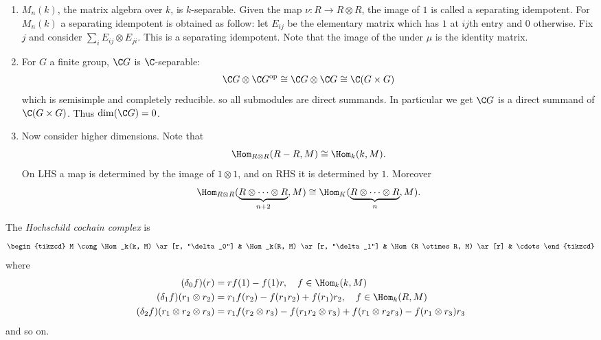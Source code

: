 \documentclass[a4paper]{article}
\begin{document}
\begin{eg}\leavevmode
  \begin{enumerate}
  \item \(M_n(k)\), the matrix algebra over \(k\), is \(k\)-separable. Given the map \(\nu: R \to R \otimes R\), the image of \(1\) is called a separating idempotent. For \(M_n(k)\) a separating idempotent is obtained as follow: let \(E_{ij}\) be the elementary matrix which has \(1\) at \(ij\)th entry and \(0\) otherwise. Fix \(j\) and consider \(\sum_i E_{ij} \otimes E_{ji}\). This is a separating idempotent. Note that the image of the under \(\mu\) is the identity matrix.
  \item For \(G\) a finite group, \(\C G\) is \(\C\)-separable:
    \[
      \C G \otimes \C G^{\text{op}}
      \cong \C G \otimes \C G
      \cong \C( G \times G)
    \]
    which is semisimple and completely reducible. so all submodules are direct summands. In particular we get \(\C G\) is a direct summand of \(\C(G \times G)\). Thus \(\dim (\C G) = 0\).
  \item Now consider higher dimensions. Note that
    \[
      \Hom_{R \otimes R} (R - R, M) \cong \Hom_k (k, M).
    \]
    On LHS a map is determined by the image of \(1 \otimes 1\), and on RHS it is determined by \(1\). Moreover
    \[
      \Hom_{R \otimes R} (\underbrace{R \otimes \dots \otimes R}_{n + 2}, M) \cong \Hom_K  (\underbrace{R \otimes \dots \otimes R}_n, M).
    \]
  \end{enumerate}
\end{eg}

\begin{definition}
  The \emph{Hochschild cochain complex} is
  \[
    \begin{tikzcd}
      M \cong \Hom_k(k, M) \ar[r, "\delta_0"] & \Hom_k(R, M) \ar[r, "\delta_1"] & \Hom(R \otimes R, M) \ar[r] & \cdots
    \end{tikzcd}
  \]
  where
  \begin{align*}
    (\delta_0 f)(r) &= rf(1) - f(1) r, \quad f \in \Hom_k(k, M) \\
    (\delta_1 f)(r_1 \otimes r_2) &= r_1 f(r_2) - f(r_1r_2) + f(r_1)r_2, \quad f \in \Hom_k(R, M) \\
    (\delta_2 f)(r_1 \otimes r_2 \otimes r_3) &= r_1 f(r_2 \otimes r_3) - f(r_1r_2 \otimes r_3) + f(r_1 \otimes r_2r_3) - f(r_1 \otimes r_3) r_3 \\
  \end{align*}
  and so on.
\end{definition}
\end{document}
